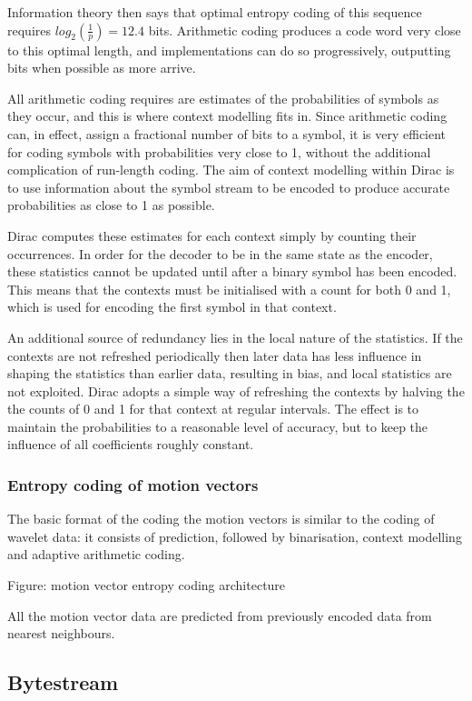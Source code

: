 Information theory then says that optimal entropy coding of this
sequence requires $log_2 (\frac{1}{p})=12.4$ bits. Arithmetic coding
produces a code word very close to this optimal length, and
implementations can do so progressively, outputting bits when possible
as more arrive.

All arithmetic coding requires are estimates of the probabilities of
symbols as they occur, and this is where context modelling fits in.
Since arithmetic coding can, in effect, assign a fractional number of
bits to a symbol, it is very efficient for coding symbols with
probabilities very close to 1, without the additional complication of
run-length coding. The aim of context modelling within Dirac is to use
information about the symbol stream to be encoded to produce accurate
probabilities as close to 1 as possible.

Dirac computes these estimates for each context simply by counting their
occurrences. In order for the decoder to be in the same state as the
encoder, these statistics cannot be updated until after a binary symbol
has been encoded. This means that the contexts must be initialised with
a count for both 0 and 1, which is used for encoding the first symbol in
that context.

An additional source of redundancy lies in the local nature of the
statistics. If the contexts are not refreshed periodically then later
data has less influence in shaping the statistics than earlier data,
resulting in bias, and local statistics are not exploited. Dirac adopts
a simple way of refreshing the contexts by halving the the counts of 0
and 1 for that context at regular intervals. The effect is to maintain
the probabilities to a reasonable level of accuracy, but to keep the
influence of all coefficients roughly constant.

\subsubsection{Entropy coding of motion vectors}

The basic format of the coding the motion vectors is similar to the
coding of wavelet data: it consists of prediction, followed by
binarisation, context modelling and adaptive arithmetic coding.


Figure: motion vector entropy coding architecture

All the motion vector data are predicted from previously encoded data
from nearest neighbours.

\subsection{Bytestream}


